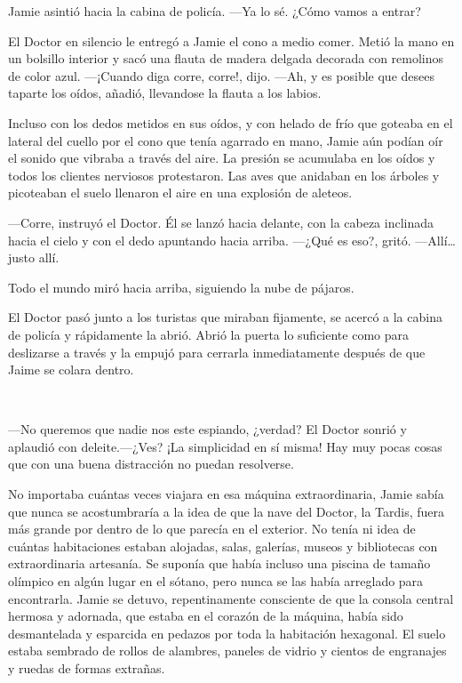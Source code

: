 Jamie asintió hacia la cabina de policía. ---Ya lo sé. ¿Cómo vamos a
entrar?

El Doctor en silencio le entregó a Jamie el cono a medio comer. Metió la
mano en un bolsillo interior y sacó una flauta de madera delgada
decorada con remolinos de color azul. ---¡Cuando diga corre, corre!,
dijo. ---Ah, y es posible que desees taparte los oídos, añadió,
llevandose la flauta a los labios.

Incluso con los dedos metidos en sus oídos, y con helado de frío que
goteaba en el lateral del cuello por el cono que tenía agarrado en mano,
Jamie aún podían oír el sonido que vibraba a través del aire. La presión
se acumulaba en los oídos y todos los clientes nerviosos protestaron.
Las aves que anidaban en los árboles y picoteaban el suelo llenaron el
aire en una explosión de aleteos.

---Corre, instruyó el Doctor. Él se lanzó hacia delante, con la cabeza
inclinada hacia el cielo y con el dedo apuntando hacia arriba. ---¿Qué
es eso?, gritó. ---Allí\ldots{} justo allí.

Todo el mundo miró hacia arriba, siguiendo la nube de pájaros.

El Doctor pasó junto a los turistas que miraban fijamente, se acercó a
la cabina de policía y rápidamente la abrió. Abrió la puerta lo
suficiente como para deslizarse a través y la empujó para cerrarla
inmediatamente después de que Jaime se colara dentro.

~

---No queremos que nadie nos este espiando, ¿verdad? El Doctor sonrió y
aplaudió con deleite.---¿Ves? ¡La simplicidad en sí misma! Hay muy pocas
cosas que con una buena distracción no puedan resolverse.

No importaba cuántas veces viajara en esa máquina extraordinaria, Jamie
sabía que nunca se acostumbraría a la idea de que la nave del Doctor, la
Tardis, fuera más grande por dentro de lo que parecía en el exterior. No
tenía ni idea de cuántas habitaciones estaban alojadas, salas, galerías,
museos y bibliotecas con extraordinaria artesanía. Se suponía que había
incluso una piscina de tamaño olímpico en algún lugar en el sótano, pero
nunca se las había arreglado para encontrarla. Jamie se detuvo,
repentinamente consciente de que la consola central hermosa y adornada,
que estaba en el corazón de la máquina, había sido desmantelada y
esparcida en pedazos por toda la habitación hexagonal. El suelo estaba
sembrado de rollos de alambres, paneles de vidrio y cientos de
engranajes y ruedas de formas extrañas.

